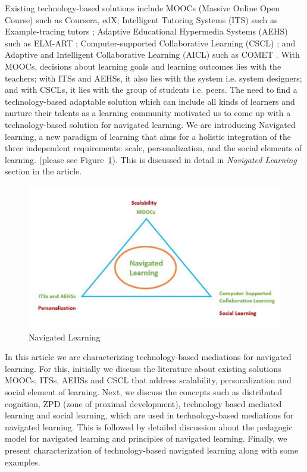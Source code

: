 \begin{multicols}{2}
Existing technology-based solutions include MOOCs (Massive Online Open Course) \cite{art2-key08} such as Coursera, edX; Intelligent Tutoring Systems (ITS) such as Example-tracing tutors \cite{art2-key04}; Adaptive Educational Hypermedia Systems (AEHS) such as ELM-ART \cite{art2-key09}; Computer-supported Collaborative Learning (CSCL) \cite{art2-key22, art2-key34}; and Adaptive and Intelligent Collaborative Learning (AICL) \cite{art2-key35} such as COMET \cite{art2-key49}. With MOOCs, decisions about learning goals and learning outcomes lies with the teachers; with ITSs and AEHSs, it also lies with the system i.e. system  designers; and with CSCLs, it lies with the group of students i.e. peers. The need to find a technology-based adaptable solution which can include all kinds of learners and nurture their talents as a learning community motivated us to come up with a technology-based solution for navigated learning. We are introducing Navigated learning, a new paradigm of learning that aims for a holistic integration of the three independent requirements: scale, personalization, and the social elements of learning. (please see Figure~\ref{chap2-fig01}). This is discussed in detail in \textit{Navigated Learning} section in the article.
\setcounter{figure}{0}
\begin{figure}[H]
\centering
\includegraphics[scale=1.05]{src/Figures/chap2/chap2-fig01.jpg}
\caption{Navigated Learning}\label{chap2-fig01}
\end{figure}

In this article we are characterizing technology-based mediations for navigated learning. For this, initially we discuss the literature about existing solutions MOOCs, ITSs, AEHSs and CSCL that address scalability, personalization and social element of learning. Next, we discuss the concepts such as distributed cognition, ZPD (zone of proximal development), technology based mediated learning and social learning, which are used in technology-based mediations for navigated learning. This is followed by detailed discussion about the pedagogic model for navigated learning and principles of navigated learning. Finally, we present characterization of technology-based navigated learning along with some examples.


\end{multicols}
